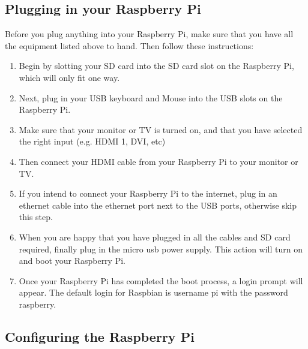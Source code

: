 \documentclass[
10pt, %
a4paper, %
oneside, %
headinclude,footinclude, %
BCOR5mm, %
]{scrartcl}
\begin{document}
\subsection{Plugging in your Raspberry Pi}
Before you plug anything into your Raspberry Pi, make sure that you have all the equipment listed above to hand. Then follow these instructions: \\
\begin{enumerate}
	\item Begin by slotting your SD card into the SD card slot on the Raspberry Pi, which will only fit one way.
	\item Next, plug in your USB keyboard and Mouse into the USB slots on the Raspberry Pi.
	\item Make sure that your monitor or TV is turned on, and that you have selected the right input (e.g. HDMI 1, DVI, etc)\\
	\item Then connect your HDMI cable from your Raspberry Pi to your monitor or TV.
	\item If you intend to connect your Raspberry Pi to the internet, plug in an ethernet cable into the ethernet port next to the USB ports, otherwise skip this step.
	\item When you are happy that you have plugged in all the cables and SD card required, finally plug in the micro usb power supply. This action will turn on and boot your Raspberry Pi.
	\item Once your Raspberry Pi has completed the boot process, a login prompt will appear. The default login for Raspbian is username pi with the password raspberry.
\end{enumerate}

\subsection{Configuring the Raspberry Pi}


%

\end{document}
